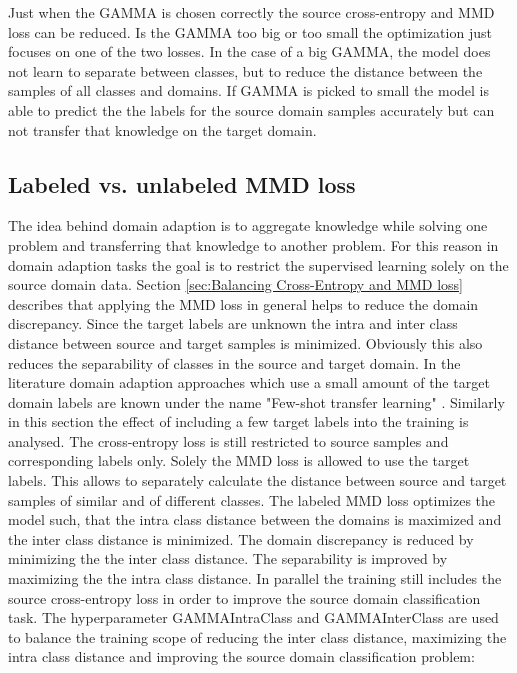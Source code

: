 Just when the GAMMA is chosen correctly the source cross-entropy and MMD loss can be reduced. Is the GAMMA too big or too small the optimization just focuses on one of the two losses. In the case of a big GAMMA, the model does not learn to separate between classes, but to reduce the distance between the samples of all classes and domains. If GAMMA is picked to small the model is able to predict the the labels for the source domain samples accurately but can not transfer that knowledge on the target domain. 






\subsection{Labeled vs. unlabeled MMD loss} \label{sec:Differences of labeled and unlabeled MMD loss}

The idea behind domain adaption is to aggregate knowledge while solving one problem and transferring that knowledge to another problem. For this reason in domain adaption tasks the goal is to restrict the supervised learning solely on the source domain data. Section \ref{sec:Balancing Cross-Entropy and MMD loss} describes that applying the MMD loss in general helps to reduce the domain discrepancy. Since the target labels are unknown the intra and inter class distance between source and target samples is minimized. Obviously this also reduces the separability of classes in the source and target domain. In the literature domain adaption approaches which use a small amount of the target domain labels are known under the name "Few-shot transfer learning" \cite{WU2020}. Similarly in this section the effect of including a few target labels into the training is analysed. The cross-entropy loss is still restricted to source samples and corresponding labels only. Solely the MMD loss is allowed to use the target labels. This allows to separately calculate the distance between source and target samples of similar and of different classes. The labeled MMD loss optimizes the model such, that the intra class distance between the domains is maximized and the inter class distance is minimized. The domain discrepancy is reduced by minimizing the the inter class distance. The separability is improved by maximizing the the intra class distance. In parallel the training still includes the source cross-entropy loss in order to improve the source domain classification task. The hyperparameter GAMMAIntraClass and GAMMAInterClass are used to balance the training scope of reducing the inter class distance, maximizing the intra class distance and improving the source domain classification problem:

